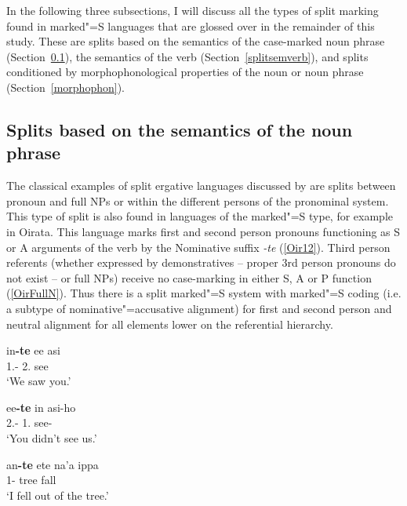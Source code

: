 \enlargethispage{\baselineskip}
In the following three subsections, I will discuss all the types of split marking found in marked"=S languages that are glossed over in the remainder of this study. 
These are splits based on the semantics of the case-marked noun phrase (Section~\ref{splitsemnoun}), the semantics of the verb (Section~\ref{splitsemverb}), and splits conditioned by morphophonological properties of the noun or noun phrase (Section~\ref{morphophon}).

\subsection{Splits based on the semantics of the noun phrase}\label{splitsemnoun}

The classical examples of split ergative languages discussed by \citet{Silverstein:1976} are splits between pronoun and full NPs or within the different persons of the pronominal system. 
This type of split is also found in languages of the marked"=S type, for example in
Oirata.
\enlargethispage{\baselineskip}
This language marks first and second person pronouns functioning as S or A arguments of the verb by the Nominative suffix \emph{-te} (\ref{Oir12}).
Third person referents (whether expressed by demonstratives -- proper 3rd person pronouns do not exist -- or full NPs) receive no case-marking in either S, A or P function (\ref{OirFullN}). 
Thus there is a split marked"=S system with marked"=S coding (i.e. a subtype of nominative"=accusative alignment) for first and second person and neutral alignment for all elements lower on the referential hierarchy.


\begin{exe}\ex\label{Oir12}\nopagebreak[4]
\begin{xlist}\ex\gll in\textbf{-te} ee asi\\
1\pl{}.\excl{}-\nom{} 2\sg{}.\polite{} see\\
\glt `We saw you.'

\ex\gll ee\textbf{-te} in asi-ho\\
2\sg.\polite{}-\nom{} 1\pl.\excl{} see-\Neg{}\\
\glt `You didn't see us.'

\ex\gll an\textbf{-te} ete na'a ippa\\
1\sg{}-\nom{} tree \obl{} fall\\
\glt `I fell out of the tree.'

\end{xlist}\end{exe}

